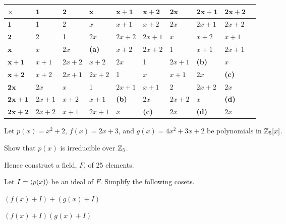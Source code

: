 \begin{example}
    \begin{table}[H]
        \centering
        \fontsize{8pt}{11pt}\selectfont
        \begin{tabular}{|l|l|l|l|l|l|l|l|l|l|}
            \hline
            $\boldsymbol{\times}$ & $\boldsymbol{1}$ & $\boldsymbol{2}$ & $\boldsymbol{x}$ & $\boldsymbol{x+1}$ & $\boldsymbol{x+2}$ & $\boldsymbol{2x}$ & $\boldsymbol{2x+1}$ & $\boldsymbol{2x+2}$ \\ \hline
            $\boldsymbol{1}$ & 1 & 2 & $x$ & $x+1$ & $x+2$ & $2x$ & $2x+1$ & $2x+2$ \\ \hline
            $\boldsymbol{2}$ & 2 & 1 & $2x$ & $2x+2$ & $2x+1$ & $x$ & $x+2$ & $x+1$ \\ \hline
            $\boldsymbol{x}$ & $x$ & $2x$ & \textbf{(a)} & $x+2$ & $2x+2$ & 1 & $x+1$ & $2x+1$ \\ \hline
            $\boldsymbol{x+1}$ & $x+1$ & $2x+2$ & $x+2$ & $2x$ & 1 & $2x+1$ & \textbf{(b)} & $x$ \\ \hline
            $\boldsymbol{x+2}$ & $x+2$ & $2x+1$ & $2x+2$ & 1 & $x$ & $x+1$ & $2x$ & \textbf{(c)} \\ \hline
            $\boldsymbol{2x}$ & $2x$ & $x$ & 1 & $2x+1$ & $x+1$ & 2 & $2x+2$ & $2x$ \\ \hline
            $\boldsymbol{2x+1}$ & $2x+1$ & $x+2$ & $x+1$ & \textbf{(b)} & $2x$ & $2x+2$ & $x$ & \textbf{(d)} \\ \hline
            $\boldsymbol{2x+2}$ & $2x+2$ & $x+1$ & $2x+1$ & $x$ & \textbf{(c)} & $2x$ & \textbf{(d)} & $2x$ \\ \hline
        \end{tabular}
    \end{table}
\end{example}

\begin{exercise}
    Let $p(x) = x^2 + 2$, $f(x) = 2x+3$, and $g(x) = 4x^2+3x+2$ be polynomials in $\mathbb{Z}_5[x]$.
    \begin{partquestions}{\roman*}
        \item Show that $p(x)$ is irreducible over $\mathbb{Z}_5$.
        \item Hence construct a field, $F$, of 25 elements.
        \item Let $I = \left\langle p(x)\right\rangle$ be an ideal of $F$.  Simplify the following cosets.
        \begin{partquestions}{\alph*}
            \item $(f(x) + I) + (g(x) + I)$
            \item $(f(x) + I)(g(x) + I)$
        \end{partquestions}
    \end{partquestions}
\end{exercise}

